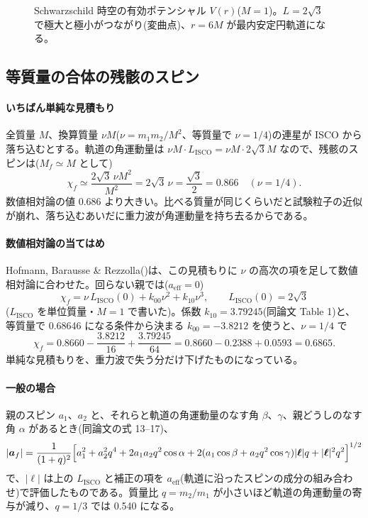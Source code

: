 \begin{figure}[H]
\centering

\caption{Schwarzschild 時空の有効ポテンシャル $V(r)$($M=1$)。$L=2\sqrt3$ で極大と極小がつながり(変曲点)、$r=6M$ が最内安定円軌道になる。}
\label{fig:veff}
\end{figure}

\subsection{等質量の合体の残骸のスピン}

\paragraph{いちばん単純な見積もり}
全質量 $M$、換算質量 $\nu M$($\nu=m_1m_2/M^2$、等質量で $\nu=1/4$)の連星が ISCO から落ち込むとする。軌道の角運動量は $\nu M\cdot L_\mathrm{ISCO}=\nu M\cdot2\sqrt3M$ なので、残骸のスピンは($M_f\simeq M$ として)
\begin{equation}
\chi_f\simeq\frac{2\sqrt3\,\nu M^2}{M^2}=2\sqrt3\,\nu=\frac{\sqrt3}{2}=0.866\quad(\nu=1/4).
\end{equation}
数値相対論の値 0.686 より大きい。比べる質量が同じくらいだと試験粒子の近似が崩れ、落ち込むあいだに重力波が角運動量を持ち去るからである。

\paragraph{数値相対論の当てはめ}
Hofmann, Barausse \& Rezzolla()は、この見積もりに $\nu$ の高次の項を足して数値相対論に合わせた。回らない親では($a_\mathrm{eff}=0$)
\begin{equation}
\chi_f=\nu\,L_\mathrm{ISCO}(0)+k_{00}\nu^2+k_{10}\nu^3,\qquad L_\mathrm{ISCO}(0)=2\sqrt3
\end{equation}
($L_\mathrm{ISCO}$ を単位質量・$M=1$ で書いた)。係数 $k_{10}=3.79245$(同論文 Table 1)と、等質量で 0.68646 になる条件から決まる $k_{00}=-3.8212$ を使うと、$\nu=1/4$ で
\begin{equation}
\chi_f=0.8660-\frac{3.8212}{16}+\frac{3.79245}{64}=0.8660-0.2388+0.0593=0.6865.
\end{equation}
単純な見積もりを、重力波で失う分だけ下げたものになっている。

\paragraph{一般の場合}
親のスピン $a_1$、$a_2$ と、それらと軌道の角運動量のなす角 $\beta$、$\gamma$、親どうしのなす角 $\alpha$ があるとき(同論文の式 13--17)、
\begin{equation}
|\bm a_f|=\frac{1}{(1+q)^2}\Bigl[a_1^2+a_2^2q^4+2a_1a_2q^2\cos\alpha+2(a_1\cos\beta+a_2q^2\cos\gamma)|\bm\ell|q+|\bm\ell|^2q^2\Bigr]^{1/2}
\end{equation}
で、$|\bm\ell|$ は上の $L_\mathrm{ISCO}$ と補正の項を $a_\mathrm{eff}$(軌道に沿ったスピンの成分の組み合わせ)で評価したものである。質量比 $q=m_2/m_1$ が小さいほど軌道の角運動量の寄与が減り、$q=1/3$ では 0.540 になる。

